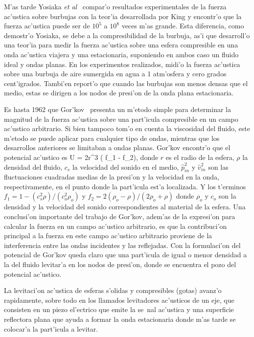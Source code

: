  M'as tarde Yosiaka {\it et al}~\cite{yosiaka55} compar'o resultados experimentales
de la fuerza ac'ustica sobre burbujas con la teor'ia desarrollada por King  y encontr'o que la fuerza ac'ustica
puede ser de $10^5$ a $10^8$ veces m'as grande. Esta diferencia, como demostr'o Yosiaka, se debe a la compresibilidad
de la burbuja, as'i que desarroll'o una teor'ia para medir la fuerza ac'ustica sobre una esfera compresible en 
una onda ac'ustica viajera y una estacionaria, suponiendo en ambos caso un fluido  ideal y ondas planas. 
En los experimentos realizados, midi'o la fuerza ac'ustica  sobre una burbuja 
de aire sumergida en agua a 1 atm'osfera y cero grados cent'igrados. 
Tambi'en report'o que cuando las burbujas son menos densas que el medio, estas se dirigen
a los nodos de presi'on de la onda plana estacionaria. 

Es hasta 1962 que  Gor'kov~\cite{gorkov62} presenta un m'etodo simple para 
determinar la magnitud de la fuerza ac'ustica sobre una part'icula compresible en un campo ac'ustico arbitrario. Si bien
tampoco tom'o en cuenta la viscosidad del fluido, este m'etodo se puede aplicar para cualquier tipo de ondas, mientras
que los desarrollos anteriores se limitaban a ondas planas. Gor'kov encontr'o que el potencial ac'ustico es
\BE\label{eq:gorkov}
U = 2\pi r^3 \rho \left(  f_1 - f_2\right),
\EE
donde $r$ es el radio de la esfera, $\rho$ la densidad del fluido, $c_s$ la velocidad del sonido en el medio,
${\hat p_{in}^2}$ y ${\hat v_{in}^2}$ son las fluctuaciones cuadradas medias de la presi'on y la velocidad en la onda, 
respectivamente,  en el punto donde la part'icula est'a localizada. Y los t'erminos $f_1 = 1 - (c_s^2\rho)/(c_o^2\rho_o)$ y 
$f_2=2(\rho_o-\rho)/(2\rho_o + \rho)$ donde $\rho_o$ y $c_o$ son la densidad y la velocidad del sonido correspondientes
al material de la esfera. Una conclusi'on importante del trabajo de Gor'kov, adem'as de la expresi'on para calcular
la fuerza en un campo ac'ustico arbitrario, es que la contribuci'on principal a la fuerza en este campo
ac'ustico arbitrario proviene de la interferencia entre las ondas incidentes y las reflejadas. Con la formulaci'on 
del potencial de Gor'kov queda claro que una part'icula de igual o menor densidad a la del fluido levitar'a
en los nodos de presi'on, donde se encuentra el pozo del potencial ac'ustico.

La levitaci'on ac'ustica de esferas s'olidas y compresibles (gotas) avanz'o rapidamente, sobre todo en 
los llamados levitadores ac'usticos de un eje, que consisten en un piezo el'ectrico que emite la se~nal
ac'ustica y una superficie reflectora plana que ayuda a formar la onda estacionaria donde m'as tarde
se colocar'a la part'icula a levitar. 


